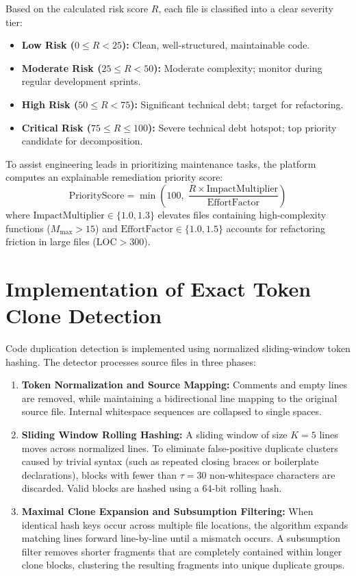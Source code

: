 Based on the calculated risk score $R$, each file is classified into a clear severity tier:
\begin{itemize}
    \item \textbf{Low Risk ($0 \le R < 25$):} Clean, well-structured, maintainable code.
    \item \textbf{Moderate Risk ($25 \le R < 50$):} Moderate complexity; monitor during regular development sprints.
    \item \textbf{High Risk ($50 \le R < 75$):} Significant technical debt; target for refactoring.
    \item \textbf{Critical Risk ($75 \le R \le 100$):} Severe technical debt hotspot; top priority candidate for decomposition.
\end{itemize}

To assist engineering leads in prioritizing maintenance tasks, the platform computes an explainable remediation priority score:
\begin{equation}
\label{eq:priority_score}
\boxed{\text{PriorityScore} = \min\left(100, \; \frac{R \times \text{ImpactMultiplier}}{\text{EffortFactor}}\right)}
\end{equation}
where $\text{ImpactMultiplier} \in \{1.0, 1.3\}$ elevates files containing high-complexity functions ($M_{\max} > 15$) and $\text{EffortFactor} \in \{1.0, 1.5\}$ accounts for refactoring friction in large files ($\text{LOC} > 300$).

\section{Implementation of Exact Token Clone Detection}
Code duplication detection is implemented using normalized sliding-window token hashing. The detector processes source files in three phases:
\begin{enumerate}
    \item \textbf{Token Normalization and Source Mapping:} Comments and empty lines are removed, while maintaining a bidirectional line mapping to the original source file. Internal whitespace sequences are collapsed to single spaces.
    \item \textbf{Sliding Window Rolling Hashing:} A sliding window of size $K = 5$ lines moves across normalized lines. To eliminate false-positive duplicate clusters caused by trivial syntax (such as repeated closing braces or boilerplate declarations), blocks with fewer than $\tau = 30$ non-whitespace characters are discarded. Valid blocks are hashed using a 64-bit rolling hash.
    \item \textbf{Maximal Clone Expansion and Subsumption Filtering:} When identical hash keys occur across multiple file locations, the algorithm expands matching lines forward line-by-line until a mismatch occurs. A subsumption filter removes shorter fragments that are completely contained within longer clone blocks, clustering the resulting fragments into unique duplicate groups.
\end{enumerate}

